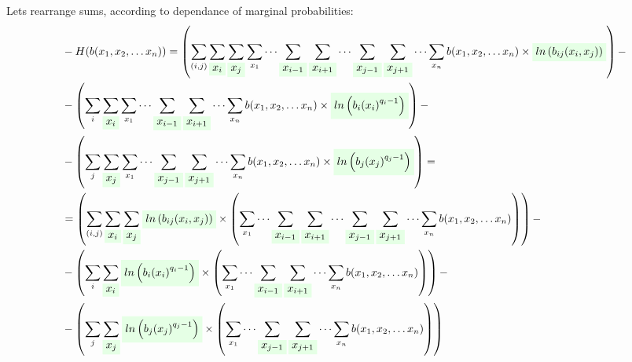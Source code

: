 \documentclass[fleqn,leqno]{article}
\newcommand{\highlight}[1]{\colorbox{green!10}{$\displaystyle#1$}}
\begin{document}
Lets rearrange sums, according to dependance of marginal probabilities:
\begin{equation}
\begin{split}
  & -H(b(x_1,x_2,\dots x_n)) = \left( \sum_{(i, j)} \sum_{\highlight{x_i}} \sum_{\highlight{x_j}} \sum_{x_1} \cdots \sum_{\highlight{x_{i-1}}} \sum_{\highlight{x_{i+1}}} \cdots \sum_{\highlight{x_{j-1}}} \sum_{\highlight{x_{j+1}}} \cdots \sum_{x_n} b(x_1, x_2, \dots x_n) \times \highlight{ln \left( b_{ij}(x_i, x_j) \right)} \right) - \\
  & -\left( \sum_i \sum_{\highlight{x_i}} \sum_{x_1} \cdots \sum_{\highlight{x_{i - 1}}} \sum_{\highlight{x_{i + 1}}} \cdots \sum_{x_n} b(x_1, x_2, \dots x_n) \times \highlight{ln \left({b_i(x_i)}^{q_i - 1}\right)} \right) - \\ 
  & -\left( \sum_j \sum_{\highlight{x_j}} \sum_{x_1} \cdots \sum_{\highlight{x_{j - 1}}} \sum_{\highlight{x_{j + 1}}} \cdots \sum_{x_n} b(x_1, x_2, \dots x_n) \times \highlight{ln \left({b_j(x_j)}^{q_j - 1}\right)} \right) = \\
  & = \left( \sum_{(i, j)} \sum_{\highlight{x_i}} \sum_{\highlight{x_j}} \highlight{ln \left( b_{ij}(x_i, x_j) \right)} \times \left( \sum_{x_1} \cdots \sum_{\highlight{x_{i-1}}} \sum_{\highlight{x_{i+1}}} \cdots \sum_{\highlight{x_{j-1}}} \sum_{\highlight{x_{j+1}}} \cdots \sum_{x_n} b(x_1, x_2, \dots x_n) \right) \right) - \\
  & -\left( \sum_i \sum_{\highlight{x_i}} \highlight{ln \left({b_i(x_i)}^{q_i - 1}\right)} \times \left( \sum_{x_1} \cdots \sum_{\highlight{x_{i - 1}}} \sum_{\highlight{x_{i + 1}}} \cdots \sum_{x_n} b(x_1, x_2, \dots x_n) \right) \right) - \\
  & -\left( \sum_j \sum_{\highlight{x_j}} \highlight{ln \left({b_j(x_j)}^{q_j - 1}\right)} \times \left( \sum_{x_1} \cdots \sum_{\highlight{x_{j - 1}}} \sum_{\highlight{x_{j + 1}}} \cdots \sum_{x_n} b(x_1, x_2, \dots x_n) \right) \right)
\end{split}
\end{equation}
\end{document}
